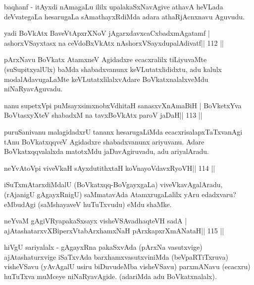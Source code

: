 \begin{artha}
baqhanf - itAyxdi nAmagaLu ililx upalakaSxNavAgive athavA heVLada deVvategaLa hesarugaLa sAmathayxRdiMda adara athaRjAcnxnavu Aguvudu.
\end{artha}

\begin{shl}
yadi BoVkAtx BaveVtApxrXNoV jAgarxdavxcaCxbadxmAgatamf |
ashorxVSayxtasx na ceVdoBxVkAtx nAshorxVSayxdupalAdivatf\hfill || 112 ||
\end{shl}

\begin{artha}
pArxNavu BoVkatx AtamxneV Agidadxre ecacxralilx tiLiyuvaMte (suSupitxyalUlx) baMda shabadxvanunx keVLutatxlididxtu, adu kalulx modalAdavugaLaMte keVLutatxlilalxvAdare BoVkatxnalalxveMdu niNaRyavAguvadu.
\end{artha}


\begin{shl}
nanu supetxV\s pi puMsayxsimxnobxVdhitaH sanasxvXnAmaBiH |
BoVketxYva BoVtasxyXteV shabadxM na tavxBoVkAtx paroV jaDaH\hfill || 113 ||
\end{shl}

\begin{artha}
puruSanivanu malagidadxrU tananx hesarugaLiMda ecacxrisalapxTaTxvanAgi tAnu BoVkatxqqveV Agidadxre shabadxvanunx ariyuvanu. Adare BoVkatxqqvalalxda matotxMdu jaDavAgiruvadu, adu ariyalAradu.
\end{artha}

\begin{shl}
neYvAtoV\s pi viveVkaH sAyxdutithxtaH koV\s nayoVdavxRyoVH\hfill || 114 ||
\end{shl}

\begin{artha}
iSuTxmAtarxdiMdalU (BoVkatxqq-BoVgayxgaLa) viveVkavAgalAradu, (rAjanigU 
gAgayxRnigU) saMmatavAda AtamxrugaLalilx yAru edadxvaru? eMbudAgi (saMshayaveV huTuTxvudu) eMdu shaMke.
\end{artha}



\begin{shl}
neYvaM gAgiVRyapakaSxsayx visheVSAvadhaqteVH sadA |
ajAtashatarxvXBiperxVtabArxhamxNaH pArxkapxrXmANataH\hfill || 115 ||
\end{shl}

\begin{artha}
hiVgU sariyalalx - gAgayxRna pakaSxvAda (pArxNa vasutxvige) ajAtashaturxvige iSaTxvAda barxhamxvasutxviniMda (beVpaRTiTxruva) visheVSavu (yAvAgalU usiru biDuvudeMba visheVSavu) parxmANavu (ecacxru) huTuTxva muMceye niNaRyavAgide. (adariMda adu BoVkatxnalalx).
\end{artha}

